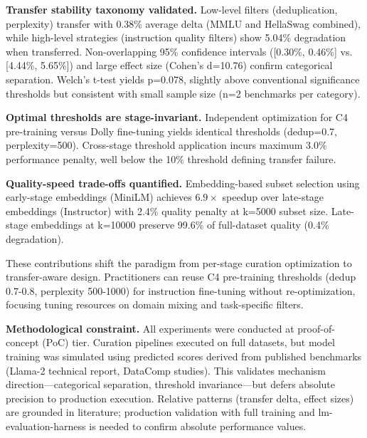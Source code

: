 \textbf{Transfer stability taxonomy validated.} Low-level filters (deduplication, perplexity) transfer with 0.38\% average delta (MMLU and HellaSwag combined), while high-level strategies (instruction quality filters) show 5.04\% degradation when transferred. Non-overlapping 95\% confidence intervals ([0.30\%, 0.46\%] vs. [4.44\%, 5.65\%]) and large effect size (Cohen's d=10.76) confirm categorical separation. Welch's t-test yields p=0.078, slightly above conventional significance thresholds but consistent with small sample size (n=2 benchmarks per category).

\textbf{Optimal thresholds are stage-invariant.} Independent optimization for C4 pre-training versus Dolly fine-tuning yields identical thresholds (dedup=0.7, perplexity=500). Cross-stage threshold application incurs maximum 3.0\% performance penalty, well below the 10\% threshold defining transfer failure.

\textbf{Quality-speed trade-offs quantified.} Embedding-based subset selection using early-stage embeddings (MiniLM) achieves 6.$9\times$ speedup over late-stage embeddings (Instructor) with 2.4\% quality penalty at k=5000 subset size. Late-stage embeddings at k=10000 preserve 99.6\% of full-dataset quality (0.4\% degradation).

These contributions shift the paradigm from per-stage curation optimization to transfer-aware design. Practitioners can reuse C4 pre-training thresholds (dedup 0.7-0.8, perplexity 500-1000) for instruction fine-tuning without re-optimization, focusing tuning resources on domain mixing and task-specific filters.

\textbf{Methodological constraint.} All experiments were conducted at proof-of-concept (PoC) tier. Curation pipelines executed on full datasets, but model training was simulated using predicted scores derived from published benchmarks (Llama-2 technical report, DataComp studies). This validates mechanism direction---categorical separation, threshold invariance---but defers absolute precision to production execution. Relative patterns (transfer delta, effect sizes) are grounded in literature; production validation with full training and lm-evaluation-harness is needed to confirm absolute performance values.
